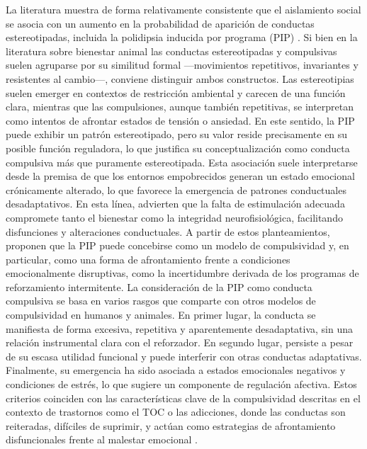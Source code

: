 \documentclass[12pt,a4paper]{article}
\begin{document}
\begin{multicols}{2}
La literatura muestra de forma relativamente consistente que el aislamiento social se asocia con un aumento en la probabilidad de aparición de conductas estereotipadas, incluida la polidipsia inducida por programa (PIP) \citep{Jones1989,ibias2016effects,wang2024social,GROSS201261}. Si bien en la literatura sobre bienestar animal las conductas estereotipadas y compulsivas suelen agruparse por su similitud formal —movimientos repetitivos, invariantes y resistentes al cambio—, conviene distinguir ambos constructos. Las estereotipias suelen emerger en contextos de restricción ambiental y carecen de una función clara, mientras que las compulsiones, aunque también repetitivas, se interpretan como intentos de afrontar estados de tensión o ansiedad. En este sentido, la PIP puede exhibir un patrón estereotipado, pero su valor reside precisamente en su posible función reguladora, lo que justifica su conceptualización como conducta compulsiva más que puramente estereotipada. Esta asociación suele interpretarse desde la premisa de que los entornos empobrecidos generan un estado emocional crónicamente alterado, lo que favorece la emergencia de patrones conductuales desadaptativos. En esta línea, \citet{GarciaRebollar2024} advierten que la falta de estimulación adecuada compromete tanto el bienestar como la integridad neurofisiológica, facilitando disfunciones y alteraciones conductuales. A partir de estos planteamientos, \citet{Moreno2012} proponen que la PIP puede concebirse como un modelo de compulsividad y, en particular, como una forma de afrontamiento frente a condiciones emocionalmente disruptivas, como la incertidumbre derivada de los programas de reforzamiento intermitente. La consideración de la PIP como conducta compulsiva se basa en varios rasgos que comparte con otros modelos de compulsividad en humanos y animales. En primer lugar, la conducta se manifiesta de forma excesiva, repetitiva y aparentemente desadaptativa, sin una relación instrumental clara con el reforzador. En segundo lugar, persiste a pesar de su escasa utilidad funcional y puede interferir con otras conductas adaptativas. Finalmente, su emergencia ha sido asociada a estados emocionales negativos y condiciones de estrés, lo que sugiere un componente de regulación afectiva. Estos criterios coinciden con las características clave de la compulsividad descritas en el contexto de trastornos como el TOC o las adicciones, donde las conductas son reiteradas, difíciles de suprimir, y actúan como estrategias de afrontamiento disfuncionales frente al malestar emocional \citep{Fineberg2010}.


\end{multicols}
\end{document}
